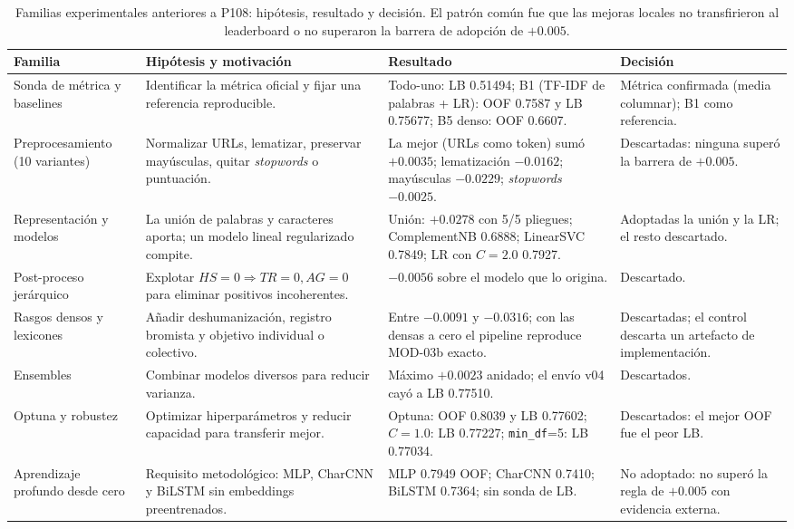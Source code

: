 \begin{table}[t]
\centering
\caption{Familias experimentales anteriores a P108: hipótesis, resultado y
decisión. El patrón común fue que las mejoras locales no transfirieron al
leaderboard o no superaron la barrera de adopción de $+0.005$.}
\label{tab:familias}
\scriptsize
\begin{tabularx}{\textwidth}{@{}>{\raggedright\arraybackslash}p{2.5cm}X>{\raggedright\arraybackslash}p{3.6cm}>{\raggedright\arraybackslash}p{2.6cm}@{}}
\toprule
Familia & Hipótesis y motivación & Resultado & Decisión \\
\midrule
Sonda de métrica y baselines & Identificar la métrica oficial y fijar una referencia reproducible. & Todo-uno: LB 0.51494; B1 (TF-IDF de palabras + LR): OOF 0.7587 y LB 0.75677; B5 denso: OOF 0.6607. & Métrica confirmada (media columnar); B1 como referencia. \\
Preprocesamiento (10 variantes) & Normalizar URLs, lematizar, preservar mayúsculas, quitar \emph{stopwords} o puntuación. & La mejor (URLs como token) sumó $+0.0035$; lematización $-0.0162$; mayúsculas $-0.0229$; \emph{stopwords} $-0.0025$. & Descartadas: ninguna superó la barrera de $+0.005$. \\
Representación y modelos & La unión de palabras y caracteres aporta; un modelo lineal regularizado compite. & Unión: $+0.0278$ con 5/5 pliegues; ComplementNB 0.6888; LinearSVC 0.7849; LR con $C=2.0$ 0.7927. & Adoptadas la unión y la LR; el resto descartado. \\
Post-proceso jerárquico & Explotar $HS=0 \Rightarrow TR=0, AG=0$ para eliminar positivos incoherentes. & $-0.0056$ sobre el modelo que lo origina. & Descartado. \\
Rasgos densos y lexicones & Añadir deshumanización, registro bromista y objetivo individual o colectivo. & Entre $-0.0091$ y $-0.0316$; con las densas a cero el pipeline reproduce MOD-03b exacto. & Descartadas; el control descarta un artefacto de implementación. \\
Ensembles & Combinar modelos diversos para reducir varianza. & Máximo $+0.0023$ anidado; el envío v04 cayó a LB 0.77510. & Descartados. \\
Optuna y robustez & Optimizar hiperparámetros y reducir capacidad para transferir mejor. & Optuna: OOF 0.8039 y LB 0.77602; $C=1.0$: LB 0.77227; \texttt{min\_df}=5: LB 0.77034. & Descartados: el mejor OOF fue el peor LB. \\
Aprendizaje profundo desde cero & Requisito metodológico: MLP, CharCNN y BiLSTM sin embeddings preentrenados. & MLP 0.7949 OOF; CharCNN 0.7410; BiLSTM 0.7364; sin sonda de LB. & No adoptado: no superó la regla de $+0.005$ con evidencia externa. \\

\end{tabularx}
\end{table}
